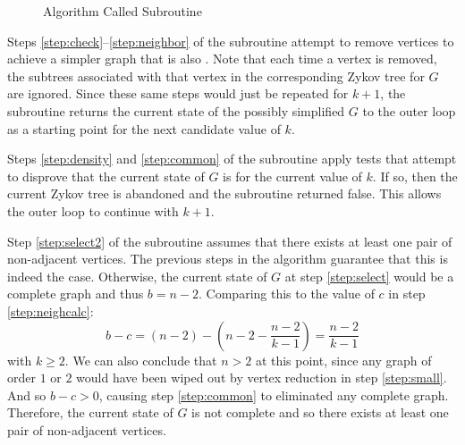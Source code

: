 \begin{figure}[h]
\begin{center}
{
    }
  \end{center}
  \caption{Algorithm Called Subroutine}
\end{figure}

Steps \ref{step:check}--\ref{step:neighbor} of the subroutine attempt to remove vertices to achieve a simpler graph
that is also .  Note that each time a vertex is removed, the subtrees associated with that vertex in
the corresponding Zykov tree for \(G\) are ignored.  Since these same steps would just be repeated for \(k+1\), the
subroutine returns the current state of the possibly simplified \(G\) to the outer loop as a starting point for the
next candidate value of \(k\).

Steps \ref{step:density} and \ref{step:common} of the subroutine apply tests that attempt to disprove that the
current state of \(G\) is  for the current value of \(k\).  If so, then the current Zykov tree is
abandoned and the subroutine returned false.  This allows the outer loop to continue with \(k+1\).

Step \ref{step:select2} of the subroutine assumes that there exists at least one pair of non-adjacent vertices.
The previous steps in the algorithm guarantee that this is indeed the case.  Otherwise, the current state of \(G\)
at step \ref{step:select} would be a complete graph and thus \(b=n-2\).  Comparing this to the value of \(c\) in
step \ref{step:neighcalc}:
\[b-c=(n-2)-\left(n-2-\frac{n-2}{k-1}\right)=\frac{n-2}{k-1}\]
with \(k\ge2\).  We can also conclude that \(n>2\) at this point, since any graph of order \(1\) or \(2\) would
have been wiped out by vertex reduction in step \ref{step:small}.  And so \(b-c>0\), causing step \ref{step:common}
to eliminated any complete graph.  Therefore, the current state of \(G\) is not complete and so there exists at
least one pair of non-adjacent vertices.

